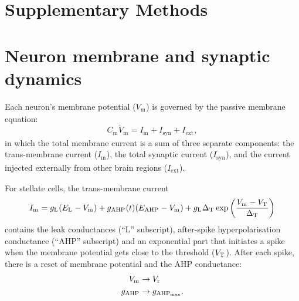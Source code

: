 \documentclass[a4paper,12pt]{article}
\newcommand{\ssc}[3]{\ensuremath{#1_{\text{#2}_{\text{#3}}}}}
\newcommand{\Cm}       {\ssc{C}      {m}     {}}
\newcommand{\Vm}       {\ssc{V}      {m}     {}}
\newcommand{\Imem}     {\ssc{I}      {m}     {}}
\newcommand{\Isyn}     {\ssc{I}      {syn}   {}}
\newcommand{\Iext}     {\ssc{I}      {ext}   {}}
\newcommand{\gL}       {\ssc{g}      {\scriptsize{L}}  {}}
\newcommand{\EL}       {\ssc{E}      {\scriptsize{L}}  {}}
\newcommand{\gAHP}     {\ssc{g}      {\scriptsize{AHP}}{}}
\newcommand{\gAHPmax}  {\ssc{g}      {\scriptsize{AHP}}{max}}
\newcommand{\EAHP}     {\ssc{E}      {\scriptsize{AHP}}{}}
\newcommand{\VT}       {\ssc{V}      {\scriptsize{T}}  {}}
\newcommand{\Vr}       {\ssc{V}      {r}     {}}
\newcommand{\deltaT}   {\ssc{\Delta} {\scriptsize{T}}{}}
\newcommand{\dVm}    {\ssc{\dot{V}}{m}   {}}
\begin{document}
\renewcommand\linenumberfont{\normalfont\small}
\resetlinenumber[724]
\linenumbers

%

\listoftodos

\clearpage


\section*{Supplementary Methods} \label{methods}

\section{Neuron membrane and synaptic dynamics} \label{nrn_Vm_syn}

Each neuron's membrane potential ($\Vm$) is governed by the passive membrane equation:
\begin{equation}
    \Cm \dVm   = \Imem + \Isyn + \Iext,
    \label{eq:Vm}
\end{equation}
in which the total membrane current is a sum of three separate components: the
trans-membrane current ($\Imem$), the total synaptic current ($\Isyn$), and the
current injected externally from other brain regions ($\Iext$). 

For stellate cells, the trans-membrane current
\begin{equation}
    \Imem = \gL(\EL-\Vm) + \gAHP(t)(\EAHP - \Vm) + \gL \deltaT \exp\left(\frac{\Vm - \VT}{\deltaT}\right)
    \label{eq:Imem_st}
\end{equation}
contains the leak conductances (``L'' subscript), after-spike hyperpolarisation
conductance (``AHP'' subscript) and an exponential part that initiates a spike
when the membrane potential gets close to the threshold ($\VT$).  After each
spike, there is a reset of membrane potential and the AHP conductance:
\begin{align}
    \Vm   & \rightarrow \Vr       \notag \\
    \gAHP & \rightarrow \gAHPmax.
    \label{eq:afterspike_st}
\end{align}
\end{document}
